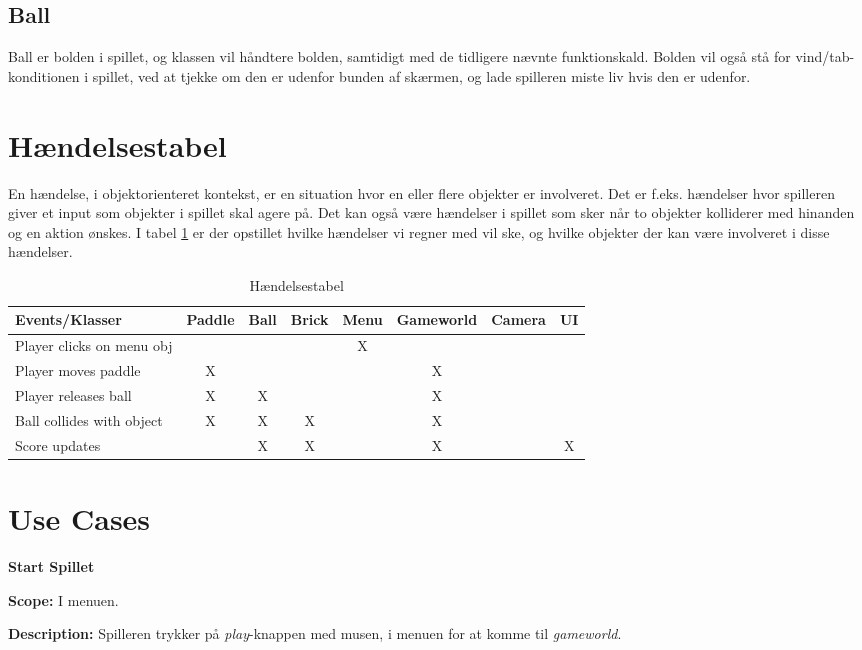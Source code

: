 \subsection{Ball}
Ball er bolden i spillet, og klassen vil håndtere bolden, samtidigt med de tidligere nævnte funktionskald. Bolden vil også stå for vind/tab-konditionen i spillet, ved at tjekke om den er udenfor bunden af skærmen, og lade spilleren miste liv hvis den er udenfor.


\section{Hændelsestabel}
En hændelse, i objektorienteret kontekst, er en situation hvor en eller flere objekter er involveret. Det er f.eks. hændelser hvor spilleren giver et input som objekter i spillet skal agere på. Det kan også være hændelser i spillet som sker når to objekter kolliderer med hinanden og en aktion ønskes. I tabel \ref{eventtabel} er der opstillet hvilke hændelser vi regner med vil ske, og hvilke objekter der kan være involveret i disse hændelser.
\begin{table}[]
\centering
\caption{Hændelsestabel}
\label{eventtabel}
\begin{tabular}{|l|c|c|c|c|c|c|c|}
\hline
Events/Klasser & Paddle & Ball & Brick & Menu & Gameworld & Camera & UI \\ \hline
Player clicks on menu obj &  &  &  & X &  &  &  \\ \hline
Player moves paddle & X &  &  &  & X &  &  \\ \hline
Player releases ball & X & X &  &  & X &  &  \\ \hline
Ball collides with object & X & X & X &  & X &  &  \\ \hline
Score updates &  & X & X &  & X &  & X \\ \hline
\end{tabular}
\end{table}

\section{Use Cases}

\textbf{Start Spillet}\newline

\textbf{Scope:}\newline
I menuen.\newline

\textbf{Description:} \newline
Spilleren trykker på \textit{play}-knappen med musen, i menuen for at komme til \textit{gameworld}. \newline


